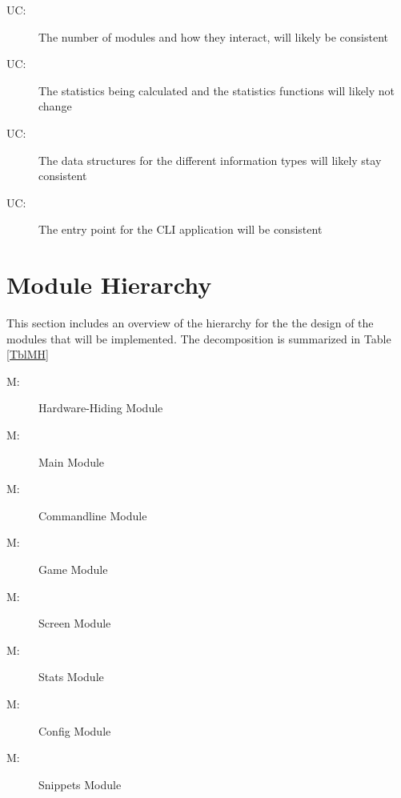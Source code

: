 \documentclass[12pt, titlepage]{article}
\newcounter{ucnum}
\newcommand{\uctheucnum}{UC\theucnum}
\newcounter{mnum}
\newcommand{\mthemnum}{M\themnum}
\begin{document}
\begin{description}
\item[ \uctheucnum \label{acHardware}:] The number of modules and how they interact, will likely be consistent
\item[ \uctheucnum \label{acSt}:] The statistics being calculated and the statistics functions will likely not change 
\item [ \uctheucnum \label{acD}:] The data structures for the different information types will likely stay consistent
\item [ \uctheucnum \label{acEnt}:] The entry point for the CLI application will be consistent
\end{description}

\section{Module Hierarchy} \label{SecMH}

This section includes an overview of the hierarchy for the the design of the modules that will be implemented. The decomposition is summarized in Table \ref{TblMH}

\begin{description}
\item [ \mthemnum \label{mHH}:] Hardware-Hiding Module
\item [ \mthemnum \label{mMa}:] Main Module
\item [ \mthemnum \label{mCl}:] Commandline Module
\item [ \mthemnum \label{mGm}:] Game Module
\item [ \mthemnum \label{mSc}:] Screen Module
\item [ \mthemnum \label{mSt}:] Stats Module
\item [ \mthemnum \label{mCg}:] Config Module
\item [ \mthemnum \label{mD}:] Snippets Module
\end{description}
\end{document}
